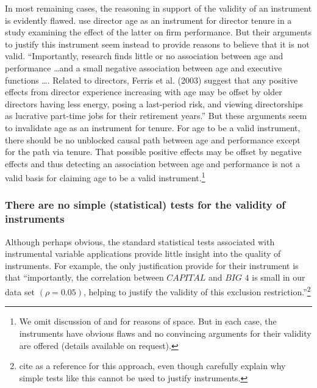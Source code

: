 \documentclass[11pt,reqno]{amsart}
\begin{document}
\begin{doublespace}
In most remaining cases, the reasoning in support of the validity of an instrument is evidently flawed. \citet{Kim:2014fm} use director age as an instrument for director tenure in a study examining the effect of the latter on firm performance. 
But their arguments to justify this instrument seem instead to provide reasons to believe that it is not valid. 
``Importantly, research finds little or no association between age and performance \dots and a small negative association between age and executive functions \dots. 
Related to directors, Ferris et al. (2003) suggest that any positive effects from director experience increasing with age may be offset by older directors having less energy, posing a last-period risk, and viewing directorships as lucrative part-time jobs for their retirement years.'' 
But these arguments seem to invalidate age as an instrument for tenure. 
For age to be a valid instrument, there should be no unblocked causal path between age and performance except for the path via tenure.
 That possible positive effects may be offset by negative effects and thus detecting an association between age and performance is not a valid basis for claiming age to be a valid instrument.\footnote{
We omit discussion of  \citet{Erkens:2014hj,Houston:2014hv} and \citet{deFranco:2014ct} for reasons of space. But in each case, the instruments have obvious flaws and no convincing arguments for their validity are offered (details available on request).}

\subsubsection{There are no simple (statistical) tests for the validity of instruments}
Although perhaps obvious, the standard statistical tests associated with instrumental variable applications provide little insight into the quality of instruments. 
For example, the only justification \citet{Guedhami:2013cj} provide for their instrument is that ``importantly, the correlation between $\textit{CAPITAL}$ and $\textit{BIG 4}$ is small in our data set $(\rho = 0.05)$, helping to justify the validity of this exclusion restriction.''\footnote{
 \citet{Guedhami:2013cj} cite \citet{Larcker:2010fq} as a reference for this approach, even though \citet{Larcker:2010fq} carefully explain why simple tests like this cannot be used to justify instruments.}


\end{doublespace}
\end{document}
